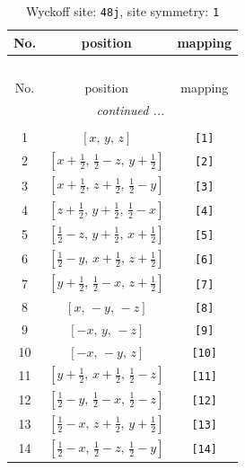 \documentclass[fleqn,8pt]{jsarticle}
\begin{document}
\begin{longtable}{ccc}
\caption{Wyckoff site: {\tt 48j}, site symmetry: {\tt 1}}
 \\
 \hline \hline
No. & position & mapping \\ \hline \endfirsthead

\multicolumn{2}{l}{\tablename\ \thetable{}} \\
 \hline \hline
No. & position & mapping \\ \hline \endhead

 \hline \hline
\multicolumn{2}{r}{\footnotesize\it continued ...} \\ \endfoot

 \hline \hline
\multicolumn{2}{r}{} \\ \endlastfoot

1 & $\left[ x,\, y,\, z \right]$ & {\tt [1]} \\ \hline
2 & $\left[ x + \frac{1}{2},\, \frac{1}{2} - z,\, y + \frac{1}{2} \right]$ & {\tt [2]} \\ \hline
3 & $\left[ x + \frac{1}{2},\, z + \frac{1}{2},\, \frac{1}{2} - y \right]$ & {\tt [3]} \\ \hline
4 & $\left[ z + \frac{1}{2},\, y + \frac{1}{2},\, \frac{1}{2} - x \right]$ & {\tt [4]} \\ \hline
5 & $\left[ \frac{1}{2} - z,\, y + \frac{1}{2},\, x + \frac{1}{2} \right]$ & {\tt [5]} \\ \hline
6 & $\left[ \frac{1}{2} - y,\, x + \frac{1}{2},\, z + \frac{1}{2} \right]$ & {\tt [6]} \\ \hline
7 & $\left[ y + \frac{1}{2},\, \frac{1}{2} - x,\, z + \frac{1}{2} \right]$ & {\tt [7]} \\ \hline
8 & $\left[ x,\, - y,\, - z \right]$ & {\tt [8]} \\ \hline
9 & $\left[ - x,\, y,\, - z \right]$ & {\tt [9]} \\ \hline
10 & $\left[ - x,\, - y,\, z \right]$ & {\tt [10]} \\ \hline
11 & $\left[ y + \frac{1}{2},\, x + \frac{1}{2},\, \frac{1}{2} - z \right]$ & {\tt [11]} \\ \hline
12 & $\left[ \frac{1}{2} - y,\, \frac{1}{2} - x,\, \frac{1}{2} - z \right]$ & {\tt [12]} \\ \hline
13 & $\left[ \frac{1}{2} - x,\, z + \frac{1}{2},\, y + \frac{1}{2} \right]$ & {\tt [13]} \\ \hline
14 & $\left[ \frac{1}{2} - x,\, \frac{1}{2} - z,\, \frac{1}{2} - y \right]$ & {\tt [14]} \\ \hline

\end{longtable}
\end{document}
